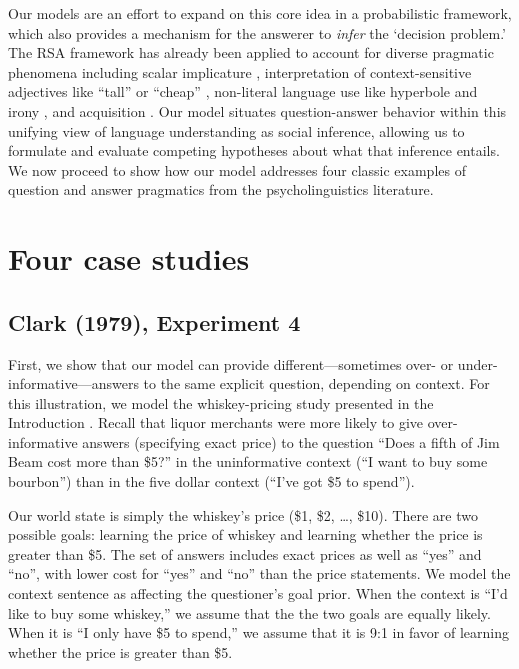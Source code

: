 \documentclass[12pt, floatsintext, man]{apa6}
\begin{document}
Our models are an effort to expand on this core idea in a probabilistic framework, which also provides a mechanism for the answerer to \emph{infer} the `decision problem.' The RSA framework has already been applied to account for diverse pragmatic phenomena including scalar implicature \cite{GoodmanStuhlmuller13_KnowledgeImplicature}, interpretation of context-sensitive adjectives like ``tall'' or ``cheap'' \cite{LassiterGoodman14_Adjectives}, non-literal language use like hyperbole \cite{KaoWuBergenGoodman14_NonliteralNumberWords} and irony \cite{KaoGoodman15_IronyCogSci}, and acquisition \cite{FrankGoodman14_InferringWordMeanings}. Our model situates question-answer behavior within this unifying view of language understanding as social inference, allowing us to formulate and evaluate competing hypotheses about what that inference entails. We now proceed to show how our model addresses four classic examples of question and answer pragmatics from the psycholinguistics literature.

\section{Four case studies}

\subsection{Clark (1979), Experiment 4}
First, we show that our model can provide different---sometimes over- or under-informative---answers to the same explicit question, depending on context. For this illustration, we model the whiskey-pricing study presented in the Introduction \cite{Clark79_IndirectSpeechActs}. Recall that liquor merchants were more likely to give over-informative answers (specifying exact price) to the question ``Does a fifth of Jim Beam cost more than \$5?'' in the uninformative context (``I want to buy some bourbon'') than in the five dollar context (``I've got \$5 to spend'').

Our world state is simply the whiskey's price (\$1, \$2, \dots, \$10). There are two possible goals: learning the price of whiskey and learning whether the price is greater than \$5. The set of answers includes exact prices as well as ``yes'' and ``no'', with lower cost for ``yes'' and ``no'' than the price statements. We model the context sentence as affecting the questioner's goal prior. When the context is ``I'd like to buy some whiskey,'' we assume that the the two goals are equally likely. When it is ``I only have \$5 to spend,'' we assume that it is 9:1 in favor of learning whether the price is greater than \$5.
\end{document}
